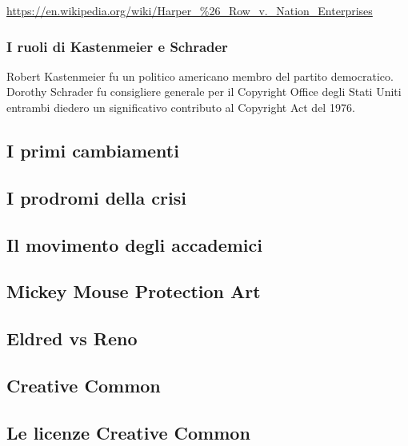 \url{https://en.wikipedia.org/wiki/Harper_%26_Row_v._Nation_Enterprises}

\subsubsection{I ruoli di Kastenmeier e Schrader}

Robert Kastenmeier fu un politico americano membro del partito democratico. 
Dorothy Schrader fu consigliere generale per il Copyright Office degli Stati Uniti entrambi diedero un significativo contributo al Copyright Act del 1976.

\subsection{I primi cambiamenti}

\subsection{I prodromi della crisi}

\subsection{Il movimento degli accademici}

\subsection{Mickey Mouse Protection Art}

\subsection{Eldred vs Reno}

\subsection{Creative Common}

\subsection{Le licenze Creative Common}